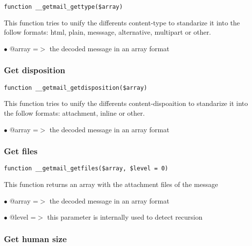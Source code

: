 \documentclass[a4paper]{article}
\begin{document}
\begin{lstlisting}
function __getmail_gettype($array)
\end{lstlisting}

This function tries to unify the differents content-type to standarize it into
the follow formats: html, plain, messsage, alternative, multipart or other.

\begin{compactitem}
\item[\color{myblue}$\bullet$] @array =$>$ the decoded message in an array format
\end{compactitem}

\hypertarget{toc42}{}
\subsubsection{Get disposition}

\begin{lstlisting}
function __getmail_getdisposition($array)
\end{lstlisting}

This function tries to unify the differents content-dispoaition to standarize
it into the follow formats: attachment, inline or other.

\begin{compactitem}
\item[\color{myblue}$\bullet$] @array =$>$ the decoded message in an array format
\end{compactitem}

\hypertarget{toc43}{}
\subsubsection{Get files}

\begin{lstlisting}
function __getmail_getfiles($array, $level = 0)
\end{lstlisting}

This function returns an array with the attachment files of the message

\begin{compactitem}
\item[\color{myblue}$\bullet$] @array =$>$ the decoded message in an array format
\item[\color{myblue}$\bullet$] @level =$>$ this parameter is internally used to detect recursion
\end{compactitem}

\hypertarget{toc44}{}
\subsubsection{Get human size}
\end{document}
